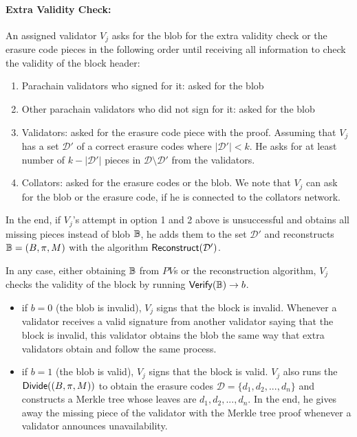 \paragraph{Extra Validity Check:}
An assigned validator $V_j$  asks for the blob for the extra validity check or the erasure code pieces in the following order until receiving all information to check the validity of the block header:
\begin{enumerate}
    \item Parachain validators who signed for it: asked for the blob
    \item Other parachain validators who did not sign for it: asked for the blob
    \item Validators: asked for the erasure code piece with the proof. Assuming that $V_j$ has a set $\mathcal{D}'$ of a correct erasure codes where $|\mathcal{D}'|<k$. He asks for at least number of $k-|\mathcal{D}'|$ pieces in $\mathcal{D}\setminus \mathcal{D}'$ from the validators.
    
    \item Collators: asked for the erasure codes or the blob. We note that $V_j$ can ask for the blob or the erasure code, if he is connected to the collators network.
    
\end{enumerate}

In the end,  if $V_j$'s attempt in option 1 and 2 above is unsuccessful and  obtains all missing pieces instead of blob $\mathbb{B}$, he adds them to the set $\mathcal{D}'$ and reconstructs  $\mathbb{B} = (B,\pi,M)$ with the algorithm $\mathsf{Reconstruct}(\mathcal{D}')$. 

In any case, either obtaining $\mathbb{B}$ from $PV$s or the reconstruction algorithm, $V_j$ checks the validity of the block by  running  $\mathsf{Verify}(\mathbb{B})\rightarrow b$.
\begin{itemize}
    \item if $b = 0$ (the blob is invalid), $V_j$ signs that the block is invalid. Whenever a validator receives a valid signature from another validator saying that the block is invalid, this validator obtains the blob  the same way that extra validators obtain and follow the same process.
    \item if $b = 1$ (the blob is valid), $V_j$ signs that the block is valid. $V_j$ also  runs the $\mathsf{Divide}((B,\pi,M))$ to obtain the erasure codes $\mathcal{D} = \{d_1,d_2,...,d_n\}$ and constructs a Merkle tree  whose leaves are $d_1,d_2,...,d_n$. In the end, he gives away the missing piece of the validator with the Merkle tree proof whenever a validator announces unavailability. 
\end{itemize}


